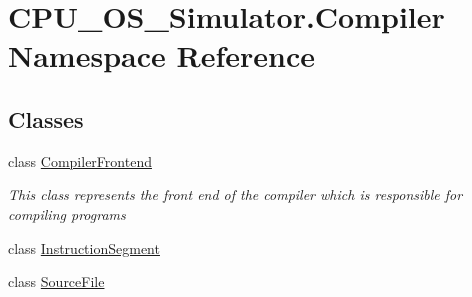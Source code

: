 \hypertarget{namespace_c_p_u___o_s___simulator_1_1_compiler}{}\section{C\+P\+U\+\_\+\+O\+S\+\_\+\+Simulator.\+Compiler Namespace Reference}
\label{namespace_c_p_u___o_s___simulator_1_1_compiler}
\subsection*{Classes}
\begin{DoxyCompactItemize}
\item 
class \hyperlink{class_c_p_u___o_s___simulator_1_1_compiler_1_1_compiler_frontend}{Compiler\+Frontend}
\begin{DoxyCompactList}\small\item\em This class represents the front end of the compiler which is responsible for compiling programs \end{DoxyCompactList}\item 
class \hyperlink{class_c_p_u___o_s___simulator_1_1_compiler_1_1_instruction_segment}{Instruction\+Segment}
\item 
class \hyperlink{class_c_p_u___o_s___simulator_1_1_compiler_1_1_source_file}{Source\+File}
\end{DoxyCompactItemize}
